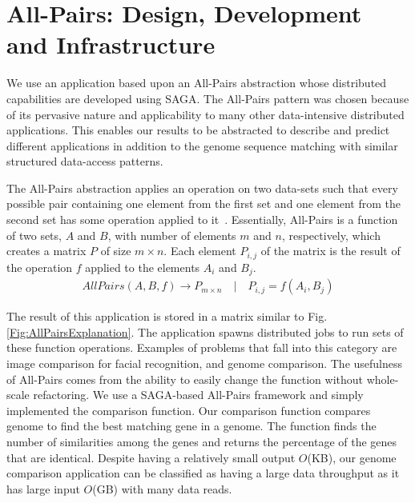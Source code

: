 \documentclass{rspublic}
\begin{document}
\vspace{-0.3cm}

\section{All-Pairs: Design, Development and Infrastructure} We use an
application based upon an All-Pairs abstraction whose distributed
capabilities are developed using SAGA. The All-Pairs pattern was
chosen because of its pervasive nature and applicability to many other
data-intensive distributed applications. This enables our results to
be abstracted to describe and predict different applications in
addition to the genome sequence matching with similar structured
data-access patterns.

The All-Pairs abstraction applies an operation on two data-sets such
that every possible pair containing one element from the first set and
one element from the second set has some operation applied to
it~\citep{AllPairs}. Essentially, All-Pairs is a function of two sets,
$A$ and $B$, with number of elements $m$ and $n$, respectively, which
creates a matrix $P$ of size $m \times n$. Each element $P_{i,j}$ of the matrix
is the result of the
operation $f$ applied to the elements $A_i$ and $B_j$.
\begin{eqnarray}
 AllPairs(A, B, f) \rightarrow P_{m \times n} \quad | \quad P_{i,j} = f(A_{i},B_{j})
 \end{eqnarray}

The result of this application is stored in a matrix similar to Fig.
\ref{Fig:AllPairsExplanation}. The application spawns distributed jobs
to run sets of these function operations. Examples of problems that fall
into this category are image comparison for facial recognition, and
genome comparison. The usefulness of All-Pairs comes from the ability
to easily change the function without whole-scale refactoring.
 We use a SAGA-based All-Pairs framework
and simply implemented the comparison function. Our comparison function
compares genome to find the best matching gene in a genome. The
function finds the number of similarities among the genes and returns
the percentage of the genes that are identical. Despite having a
relatively small output $O$(KB), our genome comparison application can
be classified as having a large data throughput as it has large input
$O$(GB) with many data reads.
\end{document}
